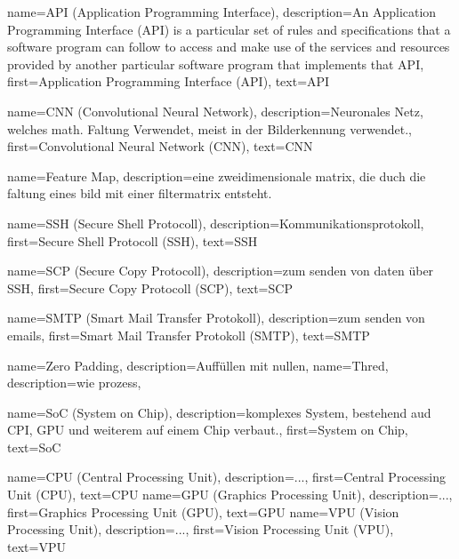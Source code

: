 {
    name={API (Application Programming Interface)},
    description={An Application Programming Interface (API) is a particular set of rules and specifications that a software program can follow to access and make use of the services and resources provided by another particular software program that implements that API},
    first={Application Programming Interface (API)},
    text={API}
}


{
    name={CNN (Convolutional Neural Network)},
    description={Neuronales Netz, welches math. Faltung 
    Verwendet, meist in der Bilderkennung verwendet.},
    first={Convolutional Neural Network (CNN)},
    text={CNN}
}

{
    name={Feature Map},
    description={eine zweidimensionale matrix, 
    die duch die faltung eines bild mit einer 
    filtermatrix entsteht.}
}

{
    name={SSH (Secure Shell Protocoll)},
    description={Kommunikationsprotokoll},
    first={Secure Shell Protocoll (SSH)},
    text={SSH}
}

{
    name={SCP (Secure Copy Protocoll)},
    description={zum senden von daten über SSH},
    first={Secure Copy Protocoll (SCP)},
    text={SCP}
}

{
    name={SMTP (Smart Mail Transfer Protokoll)},
    description={zum senden von emails},
    first={Smart Mail Transfer Protokoll (SMTP)},
    text={SMTP}
}

{
    name={Zero Padding},
    description={Auffüllen mit nullen},
}
{
    name={Thred},
    description={wie prozess},
}

{
    name={SoC (System on Chip)},
    description={komplexes System, bestehend aud 
    CPI, GPU und weiterem auf einem Chip verbaut.},
    first={System on Chip},
    text={SoC}
}

{
    name={CPU (Central Processing Unit)},
    description={...},
    first={Central Processing Unit (CPU)},
    text={CPU}
}
{
    name={GPU (Graphics Processing Unit)},
    description={...},
    first={Graphics Processing Unit (GPU)},
    text={GPU}
}
{
    name={VPU (Vision Processing Unit)},
    description={...},
    first={Vision Processing Unit (VPU)},
    text={VPU}
}
